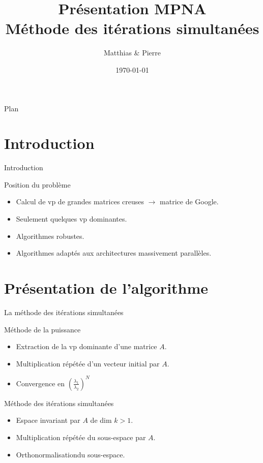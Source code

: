 \documentclass[9.5pt]{beamer}
\title[MPNA : MIS]{Présentation MPNA \\Méthode des itérations simultanées}
\author[\bsc{Beaupère} \& \bsc{Granger}]{Matthias \bsc{Beaupère} \& Pierre \bsc{Granger}}
\institute{M2 CHPS}
\date{\today}
\begin{document}

\begin{frame}
  \titlepage
\end{frame}

\begin{frame}{Plan}
	\tableofcontents[hideallsubsections]
\end{frame}

\section{Introduction}
	\begin{frame}{Introduction}
		\begin{block}{Position du problème}
			\begin{itemize}
				\item Calcul de vp de grandes matrices creuses $\rightarrow$ matrice de Google.
				\item Seulement quelques vp dominantes.
				\item Algorithmes robustes.
				\item Algorithmes adaptés aux architectures massivement parallèles.
			\end{itemize}
		\end{block}
	\end{frame}

\section{Présentation de l'algorithme}
	\begin{frame}{La méthode des itérations simultanées}
		\begin{block}{Méthode de la puissance}
			\begin{itemize}
				\item Extraction de la vp dominante d'une matrice $A$.
				\item Multiplication répétée d'un vecteur initial par $A$.
				\item Convergence en $\left(\frac{\lambda_1}{\lambda_2}\right)^N$
			\end{itemize}
		\end{block}

		\begin{block}{Méthode des itérations simultanées}
			\begin{itemize}
				\item Espace invariant par $A$ de dim $k > 1$.
				\item Multiplication répétée du sous-espace par $A$.
				\item Orthonormalisationdu sous-espace.
			\end{itemize}
		\end{block}
	\end{frame}
\end{document}
